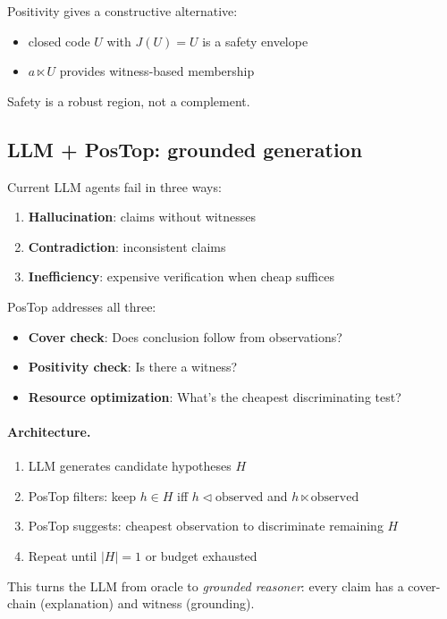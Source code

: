 \documentclass[11pt]{article}
\theoremstyle{definition}
\theoremstyle{plain}
\newcommand{\ltimesrel}{\ltimes}
\newcommand{\covers}{\triangleleft}
\begin{document}
Positivity gives a constructive alternative:
\begin{itemize}
\item closed code $U$ with $J(U)=U$ is a safety envelope
\item $a\ltimesrel U$ provides witness-based membership
\end{itemize}

Safety is a robust region, not a complement.

\subsection{LLM + PosTop: grounded generation}\label{subsec:llm-postop}

Current LLM agents fail in three ways:
\begin{enumerate}
  \item \textbf{Hallucination}: claims without witnesses
  \item \textbf{Contradiction}: inconsistent claims
  \item \textbf{Inefficiency}: expensive verification when cheap suffices
\end{enumerate}

PosTop addresses all three:
\begin{itemize}
  \item \textbf{Cover check}: Does conclusion follow from observations?
  \item \textbf{Positivity check}: Is there a witness?
  \item \textbf{Resource optimization}: What's the cheapest discriminating test?
\end{itemize}

\paragraph{Architecture.}
\begin{enumerate}
  \item LLM generates candidate hypotheses $H$
  \item PosTop filters: keep $h \in H$ iff $h \covers \text{observed}$ and $h \ltimesrel \text{observed}$
  \item PosTop suggests: cheapest observation to discriminate remaining $H$
  \item Repeat until $|H| = 1$ or budget exhausted
\end{enumerate}

This turns the LLM from oracle to \emph{grounded reasoner}: every claim has a cover-chain (explanation) and witness (grounding).
\end{document}
